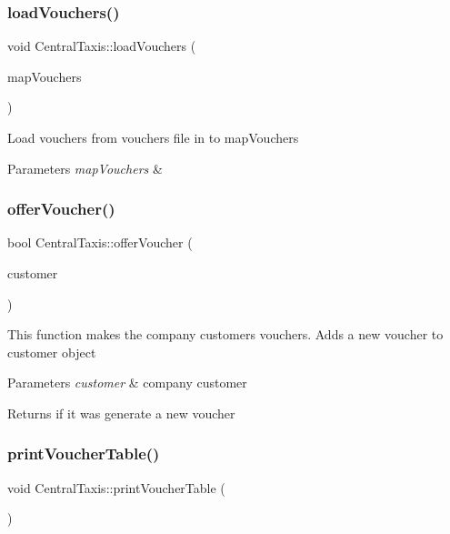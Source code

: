 \subsubsection{\texorpdfstring{load\+Vouchers()}{loadVouchers()}}
{\footnotesize\ttfamily void Central\+Taxis\+::load\+Vouchers (\begin{DoxyParamCaption}\item[{map$<$ int, \hyperlink{classVoucher}{Voucher} $\ast$$>$ \&}]{map\+Vouchers }\end{DoxyParamCaption})}

Load vouchers from vouchers file in to map\+Vouchers 
\begin{DoxyParams}{Parameters}
{\em map\+Vouchers} & \\
\hline
\end{DoxyParams}
\hypertarget{classCentralTaxis_aaa6a5d0823c6fdfe9897ce5d9c2c62d7}{}\label{classCentralTaxis_aaa6a5d0823c6fdfe9897ce5d9c2c62d7} 
\subsubsection{\texorpdfstring{offer\+Voucher()}{offerVoucher()}}
{\footnotesize\ttfamily bool Central\+Taxis\+::offer\+Voucher (\begin{DoxyParamCaption}\item[{\hyperlink{classCompanyCustomer}{Company\+Customer} $\ast$}]{customer }\end{DoxyParamCaption})}

This function makes the company customers vouchers. Adds a new voucher to customer object 
\begin{DoxyParams}{Parameters}
{\em customer} & company customer \\
\hline
\end{DoxyParams}
\begin{DoxyReturn}{Returns}
if it was generate a new voucher 
\end{DoxyReturn}
\hypertarget{classCentralTaxis_aa1888de63e2e31347ff1279b0e95f764}{}\label{classCentralTaxis_aa1888de63e2e31347ff1279b0e95f764} 
\subsubsection{\texorpdfstring{print\+Voucher\+Table()}{printVoucherTable()}}
{\footnotesize\ttfamily void Central\+Taxis\+::print\+Voucher\+Table (\begin{DoxyParamCaption}{ }\end{DoxyParamCaption})}

